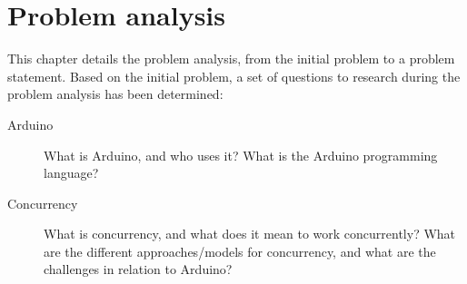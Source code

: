 \chapter{Problem analysis}\label{cha:problemanalysis}
This chapter details the problem analysis, from the initial problem to a problem statement. Based on the initial problem, a set of questions to research during the problem analysis has been determined:

\begin{description}
    \item[Arduino] What is Arduino, and who uses it? What is the Arduino programming language?
    \item[Concurrency] What is concurrency, and what does it mean to work concurrently? What are the different approaches/models for concurrency, and what are the challenges in relation to Arduino?
\end{description}





